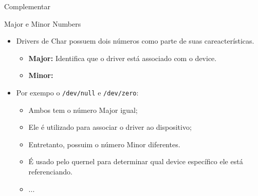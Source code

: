 \begin{frame}{Complementar}
		\begin{block}{Major e Minor Numbers}
			\begin{itemize}
				\item Drivers de Char possuem dois números como parte de suas careacterísticas.
				\begin{itemize}
					\item \textbf{Major:} Identifica que o driver está associado com o device.
					\item \textbf{Minor:}
				\end{itemize}
				\item Por exempo o \texttt{/dev/null} e \texttt{/dev/zero}:
				\begin{itemize}
					\item Ambos tem o número Major igual;
					\item Ele é utilizado para associar o driver ao dispositivo;
					\item Entretanto, possuim o número Minor diferentes.
					\item É usado pelo quernel para determinar qual device específico ele está referenciando.
					\item ...
				\end{itemize}
			
			\end{itemize}
		\end{block}


\end{frame}
